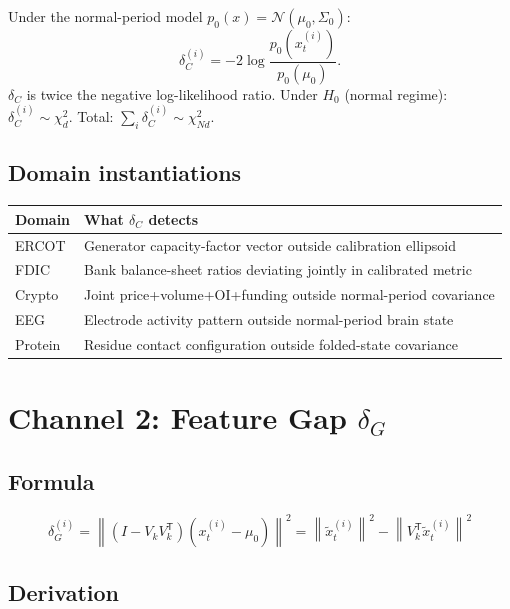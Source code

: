 \documentclass[11pt,a4paper]{article}
\theoremstyle{definition}
\newcommand{\T}{^{\mathsf{T}}}
\newcommand{\norm}[1]{\left\|#1\right\|}
\begin{document}
Under the normal-period model $p_0(x) = \mathcal{N}(\mu_0,\Sigma_0)$:
\[
\delta_C^{(i)} = -2\log\frac{p_0(x_t^{(i)})}{p_0(\mu_0)}.
\]
$\delta_C$ is twice the negative log-likelihood ratio.
Under $H_0$ (normal regime): $\delta_C^{(i)} \sim \chi^2_d$.
Total: $\sum_i\delta_C^{(i)} \sim \chi^2_{Nd}$.

\subsection{Domain instantiations}

\begin{center}
\begin{tabular}{ll}
\toprule
Domain & What $\delta_C$ detects \\
\midrule
ERCOT & Generator capacity-factor vector outside calibration ellipsoid \\
FDIC & Bank balance-sheet ratios deviating jointly in calibrated metric \\
Crypto & Joint price+volume+OI+funding outside normal-period covariance \\
EEG & Electrode activity pattern outside normal-period brain state \\
Protein & Residue contact configuration outside folded-state covariance \\
\bottomrule
\end{tabular}
\end{center}

\section{Channel 2: Feature Gap $\delta_G$}

\subsection{Formula}

\begin{lockedbox}
\[
\delta_G^{(i)} = \norm{(I - V_kV_k\T)(x_t^{(i)}-\mu_0)}^2
= \norm{\tilde x_t^{(i)}}^2 - \norm{V_k\T\tilde x_t^{(i)}}^2
\]
\end{lockedbox}

\subsection{Derivation}
\end{document}
